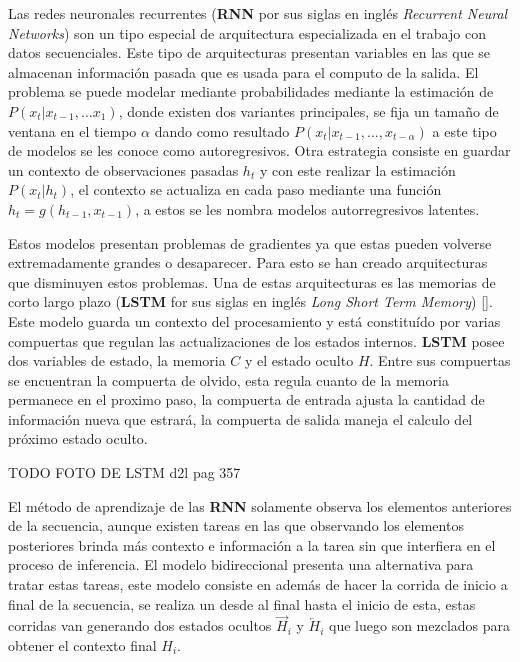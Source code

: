 Las redes neuronales recurrentes (\textbf{RNN} por sus siglas en inglés \emph{Recurrent Neural Networks}) son
un tipo especial de arquitectura especializada en el trabajo con datos secuenciales. Este tipo de arquitecturas
presentan variables en las que se almacenan información pasada que es usada para el computo de la salida. El 
problema se puede modelar mediante probabilidades mediante la estimación de $P(x_t | x_{t-1}, \dots x_{1})$,
donde existen dos variantes principales, se fija un tamaño de ventana en el tiempo $\alpha$ dando como resultado
$P(x_t | x_{t-1}, \dots, x_{t-\alpha})$ a este tipo de modelos se les conoce como autoregresivos. Otra estrategia
consiste en guardar un contexto de observaciones pasadas $h_t$ y con este realizar la estimación $P(x_t | h_t)$,
el contexto se actualiza en cada paso mediante una función $h_t = g(h_{t-1}, x_{t-1})$, a estos se les nombra
modelos autorregresivos latentes. 

Estos modelos presentan problemas de gradientes ya que estas pueden volverse extremadamente grandes o desaparecer.
Para esto se han creado arquitecturas que disminuyen estos problemas. Una de estas arquitecturas es las memorias
de corto largo plazo (\textbf{LSTM} for sus siglas en inglés \emph{Long Short Term Memory}) [\cite{TODO lstm}].
Este modelo guarda un contexto del procesamiento y está constituído por varias compuertas que regulan las 
actualizaciones de los estados internos. \textbf{LSTM} posee dos variables de estado, la memoria $C$ y el estado 
oculto $H$. Entre sus compuertas se encuentran la compuerta de olvido, esta regula cuanto de la memoria permanece
en el proximo paso, la compuerta de entrada ajusta la cantidad de información nueva que estrará, la compuerta 
de salida maneja el calculo del próximo estado oculto.

TODO FOTO DE LSTM d2l pag 357

El método de aprendizaje de las \textbf{RNN} solamente observa los elementos anteriores de la secuencia, aunque existen
tareas en las que observando los elementos posteriores brinda más contexto e información a la tarea sin que interfiera
en el proceso de inferencia. El modelo bidireccional presenta una alternativa para tratar estas tareas, este modelo
consiste en además de hacer la corrida de inicio a final de la secuencia, se realiza un desde al final hasta el  
inicio de esta, estas corridas van generando dos estados ocultos $\overrightarrow{H}_{i}$ y $\overleftarrow{H}_{i}$
que luego son mezclados para obtener el contexto final $H_i$.

